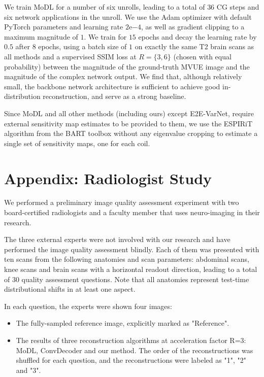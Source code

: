 We train MoDL for a number of six unrolls, leading to a total of $36$ CG steps and six network applications in the unroll. We use the Adam optimizer with default PyTorch parameters and learning rate $2\mathrm{e}{-4}$, as well as gradient clipping to a maximum magnitude of $1$. We train for $15$ epochs and decay the learning rate by $0.5$ after $8$ epochs, using a batch size of $1$ on exactly the same T2 brain scans as all methods and a supervised SSIM loss at $R=\{3,6\}$ (chosen with equal probability) between the magnitude of the ground-truth MVUE image and the magnitude of the complex network output. We find that, although relatively small, the backbone network architecture is sufficient to achieve good in-distribution reconstruction, and serve as a strong baseline.

Since MoDL and all other methods (including ours) except E2E-VarNet, require external sensitivity map estimates to be provided to them, we use the ESPIRiT algorithm from the BART toolbox \cite{bart} without any eigenvalue cropping to estimate a single set of sensitivity maps, one for each coil.

\section{Appendix: Radiologist Study}\label{app:radiologist}
We performed a preliminary image quality assessment experiment with two board-certified radiologists and a faculty member that uses neuro-imaging in their research.

The three external experts were not involved with our research and have performed the image quality assessment blindly. Each of them was presented with ten scans from the following anatomies and scan parameters: abdominal scans, knee scans and brain scans with a horizontal readout direction, leading to a total of 30 quality assessment questions. Note that all anatomies represent test-time distributional shifts in at least one aspect.

In each question, the experts were shown four images:
\begin{itemize}
    \item The fully-sampled reference image, explicitly marked as "Reference".
    \item The results of three reconstruction algorithms at acceleration factor R=3: MoDL, ConvDecoder and our method. The order of the reconstructions was shuffled for each question, and the reconstructions were labeled as "1", "2" and "3".
\end{itemize}

